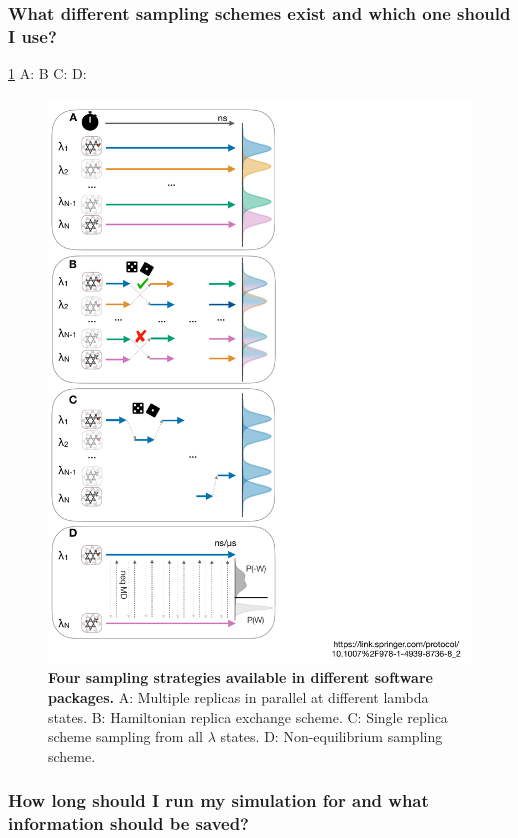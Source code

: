 \documentclass[9pt,bestpractices]{livecoms}
\begin{document}
\subsubsection*{What different sampling schemes exist and which one should I use?}
\ref{fig:fig_sampling_scheme} A:\cite{hedges2019biosimspace, song2019using } B\cite{aldeghi2015accurate, wang2015accurate,jiang2019computing} C:\cite{li2007simulated, tan2017optimally} D:\cite{aldeghi2018accurate}
\begin{figure}
    \includegraphics[width=0.95\columnwidth]{figures/fig8_sampl_scheme/Figure.pdf}
    \caption{\textbf{Four sampling strategies available in different software packages.} A: Multiple replicas in parallel at different lambda states. B: Hamiltonian replica exchange scheme. C: Single replica scheme sampling from all $\lambda$ states. D: Non-equilibrium sampling scheme.}
    \label{fig:fig_sampling_scheme}
\end{figure} 


\subsubsection*{How long should I run my simulation for and what information should be saved?}
\end{document}
